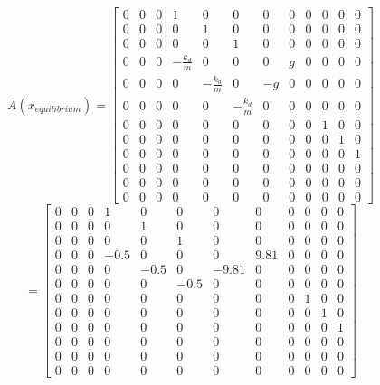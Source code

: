 $$
A(x_{equilibrium}) =
\begin{bmatrix}
0 & 0 & 0 & 1 & 0 & 0 & 0 & 0 & 0 & 0 & 0 & 0 \\
0 & 0 & 0 & 0 & 1 & 0 & 0 & 0 & 0 & 0 & 0 & 0 \\
0 & 0 & 0 & 0 & 0 & 1 & 0 & 0 & 0 & 0 & 0 & 0 \\

0 & 0 & 0 & -\frac{k_d}{m} & 0 & 0 & 0 & g & 0 & 0 & 0 & 0 \\
0 & 0 & 0 & 0 & -\frac{k_d}{m} & 0 & -g & 0 & 0 & 0 & 0 & 0 \\
0 & 0 & 0 & 0 & 0 & -\frac{k_d}{m} & 0 & 0 & 0 & 0 & 0 & 0 \\

0 & 0 & 0 & 0 & 0 & 0 & 0 & 0 & 0 & 1 & 0 & 0 \\
0 & 0 & 0 & 0 & 0 & 0 & 0 & 0 & 0 & 0 & 1 & 0 \\
0 & 0 & 0 & 0 & 0 & 0 & 0 & 0 & 0 & 0 & 0 & 1 \\

0 & 0 & 0 & 0 & 0 & 0 & 0 & 0 & 0 & 0 & 0 & 0 \\
0 & 0 & 0 & 0 & 0 & 0 & 0 & 0 & 0 & 0 & 0 & 0 \\
0 & 0 & 0 & 0 & 0 & 0 & 0 & 0 & 0 & 0 & 0 & 0
\end{bmatrix}
$$
$$
=
\begin{bmatrix}
	0 & 0 & 0 & 1 & 0 & 0 & 0 & 0 & 0 & 0 & 0 & 0 \\
	0 & 0 & 0 & 0 & 1 & 0 & 0 & 0 & 0 & 0 & 0 & 0 \\
	0 & 0 & 0 & 0 & 0 & 1 & 0 & 0 & 0 & 0 & 0 & 0 \\
	
	0 & 0 & 0 & -0.5 & 0 & 0 & 0 & 9.81 & 0 & 0 & 0 & 0 \\
	0 & 0 & 0 & 0 & -0.5 & 0 & -9.81 & 0 & 0 & 0 & 0 & 0 \\
	0 & 0 & 0 & 0 & 0 & -0.5 & 0 & 0 & 0 & 0 & 0 & 0 \\
	
	0 & 0 & 0 & 0 & 0 & 0 & 0 & 0 & 0 & 1 & 0 & 0 \\
	0 & 0 & 0 & 0 & 0 & 0 & 0 & 0 & 0 & 0 & 1 & 0 \\
	0 & 0 & 0 & 0 & 0 & 0 & 0 & 0 & 0 & 0 & 0 & 1 \\
	
	0 & 0 & 0 & 0 & 0 & 0 & 0 & 0 & 0 & 0 & 0 & 0 \\
	0 & 0 & 0 & 0 & 0 & 0 & 0 & 0 & 0 & 0 & 0 & 0 \\
	0 & 0 & 0 & 0 & 0 & 0 & 0 & 0 & 0 & 0 & 0 & 0
\end{bmatrix}
$$



